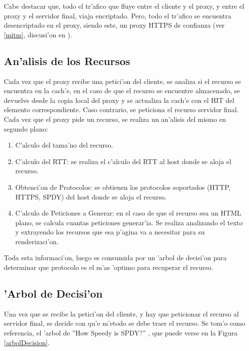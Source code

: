 Cabe destacar que, todo el tr'afico que fluye entre el cliente y el proxy, y entre el proxy y el servidor final, viaja encriptado. Pero, todo el tr'afico se encuentra desencriptado en el proxy, siendo este, un proxy HTTPS de confianza (ver \ref{mitm}, discusi'on en \citep{draftTrustedProxy}).

\subsection{An'alisis de los Recursos}
\label{analisisRecurso}
Cada vez que el proxy recibe una petici'on del cliente, se analiza si el recurso se encuentra en la cach'e, en el caso de que el recurso se encuentre almacenado, se devuelve desde la copia local del proxy y se actualiza la cach'e con el HIT del elemento correspondiente. Caso contrario, se peticiona el recurso servidor final.
Cada vez que el proxy pide un recurso, se realiza un an'alisis del mismo en segundo plano:
\begin{enumerate}
\item C'alculo del tama'no del recurso.
\item C'alculo del RTT: se realiza el c'alculo del RTT al host donde se aloja el recurso.
\item Obtenci'on de Protocolos: se obtienen los protocolos soportados (HTTP, HTTPS, SPDY) del host donde se aloja el recurso.
\item C'alculo de Peticiones a Generar: en el caso de que el recurso sea un HTML plano, se calcula cuantas peticiones generar'ia. Se realiza analizando el texto y extrayendo los recursos que esa p'agina va a necesitar para su renderizaci'on.
\end{enumerate}
Toda esta informaci'on, luego es consumida por un 'arbol de decisi'on para determinar que protocolo es el m'as 'optimo para recuperar el recurso.

\subsection{'Arbol de Decisi'on}

Una vez que se recibe la petici'on del cliente, y hay que peticionar el recurso al servidor final, se decide con qu'e m'etodo se debe traer el recurso. Se tom'o como referencia, el 'arbol de ''How Speedy is SPDY?'' \citep{howSpeedy}, que puede verse en la Figura \ref{arbolDecision}.

